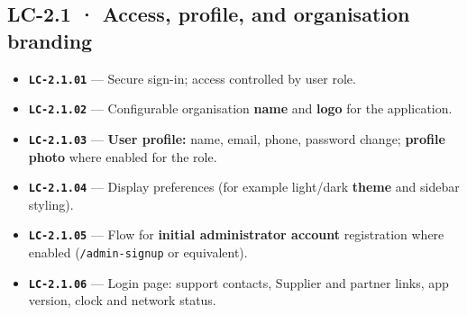 \documentclass[11pt,a4paper]{article}
\newcommand{\LC}[1]{\textbf{\texttt{#1}}}
\begin{document}
\subsection*{LC-2.1 · Access, profile, and organisation branding}
\begin{itemize}
  \item \LC{LC-2.1.01} --- Secure sign-in; access controlled by user role.
  \item \LC{LC-2.1.02} --- Configurable organisation \textbf{name} and \textbf{logo} for the application.
  \item \LC{LC-2.1.03} --- \textbf{User profile:} name, email, phone, password change; \textbf{profile photo} where enabled for the role.
  \item \LC{LC-2.1.04} --- Display preferences (for example light/dark \textbf{theme} and sidebar styling).
  \item \LC{LC-2.1.05} --- Flow for \textbf{initial administrator account} registration where enabled (\texttt{/admin-signup} or equivalent).
  \item \LC{LC-2.1.06} --- Login page: support contacts, Supplier and partner links, app version, clock and network status.
\end{itemize}
\end{document}
